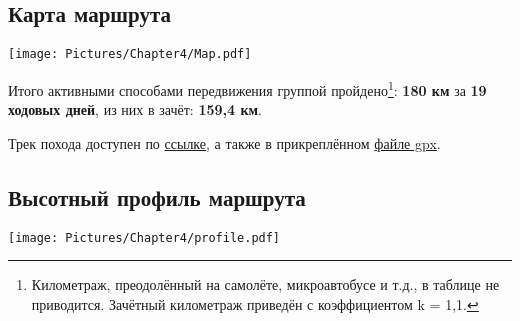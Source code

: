 	
	\subsection{Карта маршрута}
		\mbox{\texttt{[image: Pictures/Chapter4/Map.pdf]}}

		Итого активными способами передвижения группой пройдено\footnote{Километраж, преодолённый на самолёте,
		микроавтобусе и т.д., в таблице не приводится. Зачётный километраж приведён с коэффициентом k = 1,1.}:
		\textbf{180 км} за \textbf{19 ходовых дней}, из них в зачёт: \textbf{159,4 км}.

		Трек похода доступен по \href{https://nakarte.me/#m=10/43.08945/43.14674&l=O&nktl=fI_Vhwot_mXwo3snYI90KA}{ссылке},
		а также в прикреплённом \href{run:./track.gpx}{файле gpx}.
	
	
	\subsection{Высотный профиль маршрута}
		\mbox{\texttt{[image: Pictures/Chapter4/profile.pdf]}}
